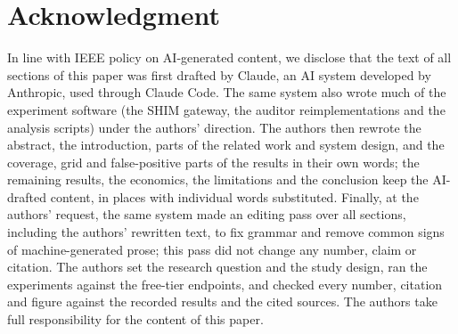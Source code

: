 \section*{Acknowledgment}
In line with IEEE policy on AI-generated content, we disclose that the text of all sections of
this paper was first drafted by Claude, an AI system developed by Anthropic, used through Claude
Code. The same system also wrote much of the experiment software (the SHIM gateway, the auditor
reimplementations and the analysis scripts) under the authors' direction. The authors then
rewrote the abstract, the introduction, parts of the related work and system design, and the
coverage, grid and false-positive parts of the results in their own words; the remaining results,
the economics, the limitations and the conclusion keep the AI-drafted content, in places with
individual words substituted. Finally, at the authors' request, the same system made an editing pass over all
sections, including the authors' rewritten text, to fix grammar and remove common signs of
machine-generated prose; this pass did not change any number, claim or citation. The authors set the research question and the study design, ran the experiments against
the free-tier endpoints, and checked every number, citation and figure against the recorded results
and the cited sources. The authors take full responsibility for the content of this paper.

